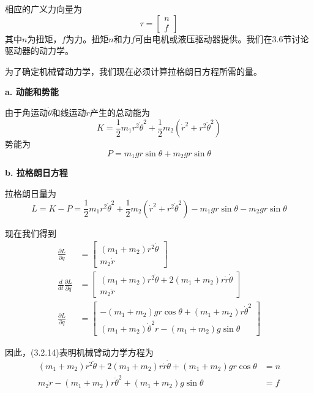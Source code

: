 \documentclass[12pt,a4paper]{ctexart}
\begin{document}
相应的广义力向量为
\begin{equation}
\tau = \begin{bmatrix} n \\ f \end{bmatrix}
\end{equation}
其中$n$为扭矩，$f$为力。扭矩$n$和力$f$可由电机或液压驱动器提供。我们在3.6节讨论驱动器的动力学。

为了确定机械臂动力学，我们现在必须计算拉格朗日方程所需的量。

\textbf{a. 动能和势能}

由于角运动$\dot{\theta}$和线运动$\dot{r}$产生的总动能为
\begin{equation}
K = \frac{1}{2}m_1r^2\dot{\theta}^2 + \frac{1}{2}m_2(\dot{r}^2 + r^2\dot{\theta}^2)
\end{equation}
势能为
\begin{equation}
P = m_1gr\sin\theta + m_2gr\sin\theta
\end{equation}

\textbf{b. 拉格朗日方程}

拉格朗日量为
\begin{equation}
L = K - P = \frac{1}{2}m_1r^2\dot{\theta}^2 + \frac{1}{2}m_2(\dot{r}^2 + r^2\dot{\theta}^2) - m_1gr\sin\theta - m_2gr\sin\theta
\end{equation}

现在我们得到
\begin{align}
\frac{\partial L}{\partial \dot{q}} &= \begin{bmatrix} (m_1+m_2)r^2\dot{\theta} \\ m_2\dot{r} \end{bmatrix} \\
\frac{d}{dt}\frac{\partial L}{\partial \dot{q}} &= \begin{bmatrix} (m_1+m_2)r^2\ddot{\theta} + 2(m_1+m_2)r\dot{r}\dot{\theta} \\ m_2\ddot{r} \end{bmatrix} \\
\frac{\partial L}{\partial q} &= \begin{bmatrix} -(m_1+m_2)gr\cos\theta + (m_1+m_2)r\dot{\theta}^2 \\ (m_1+m_2)\dot{\theta}^2r - (m_1+m_2)g\sin\theta \end{bmatrix}
\end{align}

因此，(3.2.14)表明机械臂动力学方程为
\begin{align}
(m_1+m_2)r^2\ddot{\theta} + 2(m_1+m_2)r\dot{r}\dot{\theta} + (m_1+m_2)gr\cos\theta &= n \\
m_2\ddot{r} - (m_1+m_2)r\dot{\theta}^2 + (m_1+m_2)g\sin\theta &= f
\end{align}
\end{document}
